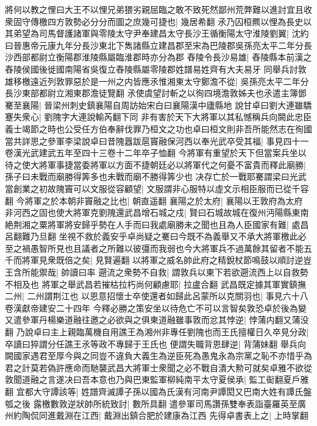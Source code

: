 將何以教之悝曰大王不以悝兄弟猥劣親屈臨之敢不致死然鄙州荒弊難以進討宜且收衆固守傳檄四方敦勢必分分而圖之庶幾可捷也|{
	幾居希翻}
氶乃囚桓羆以悝為長史以其弟望為司馬督護諸軍與零陵太守尹奉建昌太守長沙王循衡陽太守淮陵劉翼|{
	沈約曰晉惠帝元康九年分長沙東北下雋諸縣立建昌郡至宋為巴陵郡吳孫亮太平二年分長沙西部都尉立衡陽郡淮陵縣屬臨淮郡時亦分為郡}
舂陵令長沙易雄|{
	舂陵縣本前漢之舂陵侯國後徙國南陽省吳復立舂陵縣屬零陵郡姓譜易姓齊有大夫易牙}
同舉兵討敦雄移檄遠近列敦罪惡於是一州之内皆應氶惟湘東太守鄭澹不從|{
	吳孫亮太平二年分長沙東部都尉立湘東郡澹徒覽翻}
氶使虞望討斬之以徇四境澹敦姊夫也氶遣主簿鄧騫至襄陽|{
	晉梁州刺史鎮襄陽自周訪始宋白曰襄陽漢中廬縣地}
說甘卓曰劉大連雖驕蹇失衆心|{
	劉隗字大連說輸芮翻下同}
非有害於天下大將軍以其私憾稱兵向闕此忠臣義士竭節之時也公受任方伯奉辭伐罪乃桓文之功也卓曰桓文則非吾所能然志在徇國當共詳思之參軍李梁說卓曰昔隗囂跋扈竇融保河西以奉光武卒受其福|{
	事見四十一卷漢光武建武五年至四十三卷十二年卒子恤翻}
今將軍有重望於天下但當案兵坐以待之使大將軍事捷當委將軍以方面不捷朝廷必以將軍代之何憂不富貴而釋此廟勝|{
	孫子曰未戰而廟勝得筭多也未戰而廟不勝得筭少也}
决存亡於一戰耶騫謂梁曰光武當創業之初故隗竇可以文服從容顧望|{
	文服謂非心服特以虛文示相臣服而已從千容翻}
今將軍之於本朝非竇融之比也|{
	朝直遥翻}
襄陽之於太府|{
	襄陽以王敦府為太府}
非河西之固也使大將軍克劉隗還武昌增石城之戍|{
	賢曰石城故城在復州沔陽縣東南}
絶荆湘之粟將軍將安歸乎勢在人手而曰我處廟勝未之聞也且為人臣國家有難|{
	處昌呂翻難乃旦翻}
坐視不救於義安乎卓尚疑之騫曰今既不為義舉又不承大將軍檄此必至之禍愚智所見也且議者之所難以彼彊而我弱也今大將軍兵不過萬餘其留者不能五千而將軍見衆既倍之矣|{
	見賢遍翻}
以將軍之威名帥此府之精銳杖節鳴鼓以順討逆豈王含所能禦哉|{
	帥讀曰率}
遡流之衆勢不自救|{
	謂敦兵以東下若欲遡流西上以自救勢不相及也}
將軍之舉武昌若摧枯拉朽尚何顧慮耶|{
	拉盧合翻}
武昌既定據其軍實鎮撫二州|{
	二州謂荆江也}
以恩意招懷士卒使還者如歸此呂蒙所以克關羽也|{
	事見六十八卷漢獻帝建安二十四年}
今釋必勝之策安坐以待危亡不可以言智矣敦恐卓於後為變又遣參軍丹楊樂道融往邀之必欲與之俱東道融雖事敦而忿其悖逆|{
	悖蒲内翻又蒲没翻}
乃說卓曰主上親臨萬機自用譙王為湘州非專任劉隗也而王氏擅權日久卒見分政|{
	卒讀曰猝謂分任譙王氶等政不專歸于王氏也}
便謂失職背恩肆逆|{
	背蒲妹翻}
舉兵向闕國家遇君至厚今與之同豈不違負大義生為逆臣死為愚鬼永為宗黨之恥不亦惜乎為君之計莫若偽許應命而馳襲武昌大將軍士衆聞之必不戰自潰大勲可就矣卓雅不欲從敦聞道融之言遂决曰吾本意也乃與巴東監軍柳純南平太守夏侯承|{
	監工䘖翻夏戶雅翻}
宜都大守譚該等|{
	姓譜齊滅譚子孫以國為氏漢有河南尹譚閎又巴南大姓有譚氏盤瓠之後}
露檄數敦逆狀帥所統致討|{
	數所具翻}
遣參軍司馬讚孫雙奉表詣臺羅英至廣州約陶侃同進戴淵在江西|{
	戴淵出鎮合肥於建康為江西}
先得卓書表上之|{
	上時掌翻}
